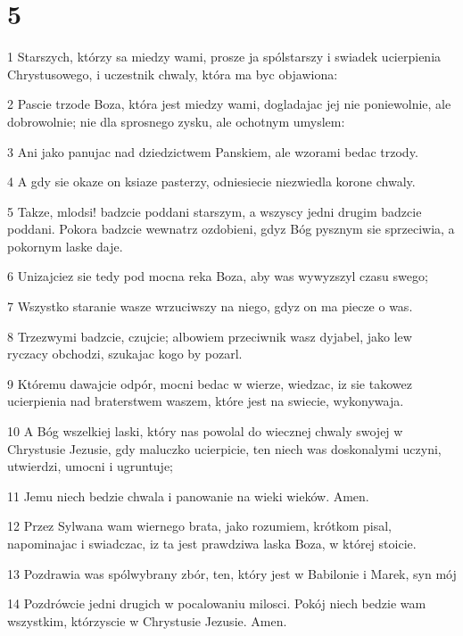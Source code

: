 \chapter{5}

\par 1 Starszych, którzy sa miedzy wami, prosze ja spólstarszy i swiadek ucierpienia Chrystusowego, i uczestnik chwaly, która ma byc objawiona:
\par 2 Pascie trzode Boza, która jest miedzy wami, dogladajac jej nie poniewolnie, ale dobrowolnie; nie dla sprosnego zysku, ale ochotnym umyslem:
\par 3 Ani jako panujac nad dziedzictwem Panskiem, ale wzorami bedac trzody.
\par 4 A gdy sie okaze on ksiaze pasterzy, odniesiecie niezwiedla korone chwaly.
\par 5 Takze, mlodsi! badzcie poddani starszym, a wszyscy jedni drugim badzcie poddani. Pokora badzcie wewnatrz ozdobieni, gdyz Bóg pysznym sie sprzeciwia, a pokornym laske daje.
\par 6 Unizajciez sie tedy pod mocna reka Boza, aby was wywyzszyl czasu swego;
\par 7 Wszystko staranie wasze wrzuciwszy na niego, gdyz on ma piecze o was.
\par 8 Trzezwymi badzcie, czujcie; albowiem przeciwnik wasz dyjabel, jako lew ryczacy obchodzi, szukajac kogo by pozarl.
\par 9 Któremu dawajcie odpór, mocni bedac w wierze, wiedzac, iz sie takowez ucierpienia nad braterstwem waszem, które jest na swiecie, wykonywaja.
\par 10 A Bóg wszelkiej laski, który nas powolal do wiecznej chwaly swojej w Chrystusie Jezusie, gdy maluczko ucierpicie, ten niech was doskonalymi uczyni, utwierdzi, umocni i ugruntuje;
\par 11 Jemu niech bedzie chwala i panowanie na wieki wieków. Amen.
\par 12 Przez Sylwana wam wiernego brata, jako rozumiem, krótkom pisal, napominajac i swiadczac, iz ta jest prawdziwa laska Boza, w której stoicie.
\par 13 Pozdrawia was spólwybrany zbór, ten, który jest w Babilonie i Marek, syn mój
\par 14 Pozdrówcie jedni drugich w pocalowaniu milosci. Pokój niech bedzie wam wszystkim, którzyscie w Chrystusie Jezusie. Amen.


